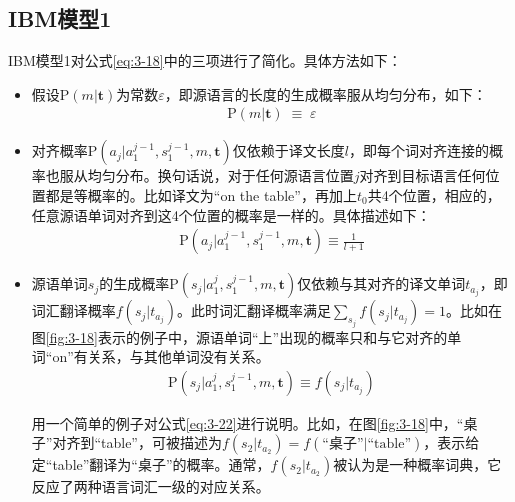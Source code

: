 \vspace{-0.5em}
\subsection{IBM模型1}
\parinterval IBM模型1对公式\ref{eq:3-18}中的三项进行了简化。具体方法如下：

\begin{itemize}
\item 假设$\textrm{P}(m|\mathbf{t})$为常数$\varepsilon$，即源语言的长度的生成概率服从均匀分布，如下：
\begin{eqnarray}
\textrm{P}(m|\mathbf{t})\; \equiv \; \varepsilon
\label{eq:3-20}
\end{eqnarray}
\item 对齐概率$\textrm{P}(a_j|a_1^{j-1},s_1^{j-1},m,\mathbf{t})$仅依赖于译文长度$l$，即每个词对齐连接的概率也服从均匀分布。换句话说，对于任何源语言位置$j$对齐到目标语言任何位置都是等概率的。比如译文为``on the table''，再加上$t_0$共4个位置，相应的，任意源语单词对齐到这4个位置的概率是一样的。具体描述如下：
\begin{eqnarray}
\textrm{P}(a_j|a_1^{j-1},s_1^{j-1},m,\mathbf{t}) \equiv \frac{1}{l+1}
\label{eq:3-21}
\end{eqnarray}

\item 源语单词$s_j$的生成概率$\textrm{P}(s_j|a_1^{j},s_1^{j-1},m,\mathbf{t})$仅依赖与其对齐的译文单词$t_{a_j}$，即词汇翻译概率$f(s_j|t_{a_j})$。此时词汇翻译概率满足$\sum_{s_j}{f(s_j|t_{a_j})}=1$。比如在图\ref{fig:3-18}表示的例子中，源语单词``上''出现的概率只和与它对齐的单词``on''有关系，与其他单词没有关系。
\begin{eqnarray}
\textrm{P}(s_j|a_1^{j},s_1^{j-1},m,\mathbf{t}) \equiv f(s_j|t_{a_j})
\label{eq:3-22}
\end{eqnarray}

用一个简单的例子对公式\ref{eq:3-22}进行说明。比如，在图\ref{fig:3-18}中，``桌子''对齐到``table''，可被描述为$f(s_2 |t_{a_2})=f(\textrm{``桌子''}|\textrm{``table''})$，表示给定``table''翻译为``桌子''的概率。通常，$f(s_2 |t_{a_2})$被认为是一种概率词典，它反应了两种语言词汇一级的对应关系。
\end{itemize}

